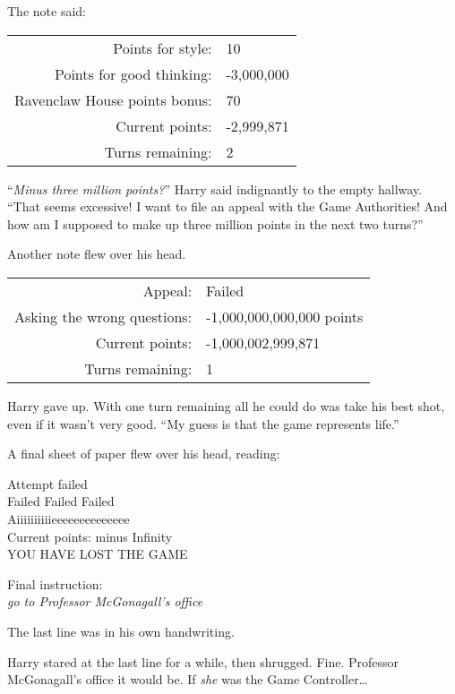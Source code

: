 The note said:
\begin{writtenNote}
\begin{tabular}{rl}
Points for style: & 10\\
Points for good thinking: & -3,000,000\\
Ravenclaw House points bonus: & 70\\
Current points: & -2,999,871\\
Turns remaining: & 2
\end{tabular}
\end{writtenNote}

“\emph{Minus three million points?}” Harry said indignantly to the empty hallway. “That seems excessive! I want to file an appeal with the Game Authorities! And how am I supposed to make up three million points in the next two turns?”

Another note flew over his head.
\begin{writtenNote}
\begin{tabular}{rl}
Appeal: & Failed\\
Asking the wrong questions: & -1,000,000,000,000 points\\
Current points: & -1,000,002,999,871\\
Turns remaining: & 1
\end{tabular}
\end{writtenNote}

Harry gave up. With one turn remaining all he could do was take his best shot, even if it wasn’t very good. “My guess is that the game represents life.”

A final sheet of paper flew over his head, reading:

\begin{writtenNote}
Attempt failed\\
Failed Failed Failed\\
Aiiiiiiiiiieeeeeeeeeeeeee\\
Current points: minus Infinity\\
\MakeUppercase{You have lost the game}

Final instruction:\\
\emph{go to Professor McGonagall’s office}
\end{writtenNote}

The last line was in his own handwriting.

Harry stared at the last line for a while, then shrugged. Fine. Professor McGonagall’s office it would be. If \emph{she} was the Game Controller…

